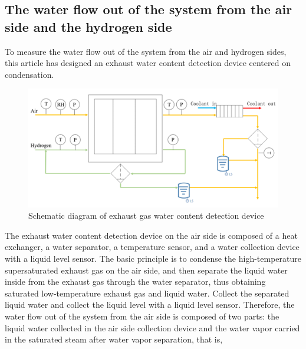 \subsection*{The water flow out of the system from the air side and the hydrogen side}
To measure the water flow out of the system from the air and hydrogen sides, this article has designed an exhaust water content detection device centered on condensation.
\begin{figure}
	\centering
	
	\includegraphics[scale=0.6]{Research_pictures/picture3.png}
	\caption[short]{Schematic diagram of exhaust gas water content detection device}
	\label{fig:water_detection_device_diagram}
\end{figure}
The exhaust water content detection device on the air side is composed of a heat exchanger, a water separator, a temperature sensor, and a water collection device with a liquid level sensor. The basic principle is to condense the high-temperature supersaturated exhaust gas on the air side, and then separate the liquid water inside from the exhaust gas through the water separator, thus obtaining saturated low-temperature exhaust gas and liquid water. Collect the separated liquid water and collect the liquid level with a liquid level sensor.
Therefore, the water flow out of the system from the air side is composed of two parts: the liquid water collected in the air side collection device and the water vapor carried in the saturated steam after water vapor separation, that is,
